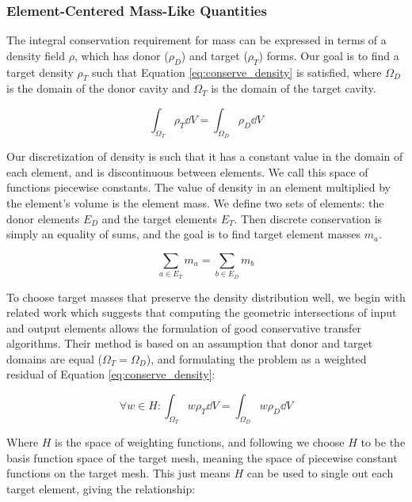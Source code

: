 \subsubsection{Element-Centered Mass-Like Quantities}
\label{sec:conserve_mass}

The integral conservation requirement for mass can be expressed
in terms of a density field $\rho$, which has donor ($\rho_D$)
and target ($\rho_T$) forms.
Our goal is to find a target density $\rho_T$ such that Equation
\ref{eq:conserve_density} is satisfied,
where $\Omega_D$ is the domain of the donor cavity and
$\Omega_T$ is the domain of the target cavity.

\begin{equation} \label{eq:conserve_density}
\int_{\Omega_T} \rho_T \dd V = \int_{\Omega_D} \rho_D \dd V
\end{equation}

Our discretization of density is such that it has a constant
value in the domain of each element, and is discontinuous between
elements.
We call this space of functions piecewise constants.
The value of density in an element multiplied by the element's
volume is the element mass.
We define two sets of elements: the donor elements $E_D$ and
the target elements $E_T$.
Then discrete conservation is simply an equality of sums,
and the goal is to find target element masses $m_a$.

\begin{equation}
\sum_{a \in E_T} m_a = \sum_{b \in E_D} m_b
\end{equation}

To choose target masses that preserve the density distribution well,
we begin with related work
\cite{jiao2004common,farrell2009conservative} which suggests that
computing the geometric intersections of input and output elements
allows the formulation of good conservative transfer algorithms.
Their method is based on an assumption that donor and target domains
are equal ($\Omega_T=\Omega_D$), and formulating the problem as a
weighted residual of Equation \ref{eq:conserve_density}:

\begin{equation} \label{eq:weighted_residual}
\forall w \in H: \int_{\Omega_T} w \rho_T \dd V = \int_{\Omega_D} w \rho_D \dd V
\end{equation}

Where $H$ is the space of weighting functions, and following
\cite{jiao2004common} we choose $H$ to be the basis function space of the target mesh,
meaning the space of piecewise constant functions on the target mesh.
This just means $H$ can be used to single out each target element,
giving the relationship:

